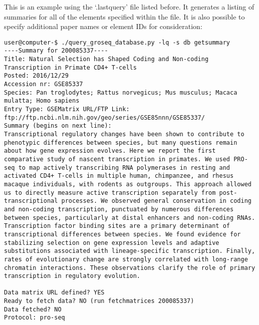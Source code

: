\documentclass[12pt,letterpaper]{article}
\begin{document}
This is an example using the `.lastquery' file listed before. It generates a listing of summaries for all of the elements specified within the file.
It is also possible to specify additional paper names or element IDs for consideration:
\begin{verbatim}
user@computer-$ ./query_groseq_database.py -lq -s db getsummary
----Summary for 200085337----
Title: Natural Selection has Shaped Coding and Non-coding Transcription in Primate CD4+ T-cells
Posted: 2016/12/29
Accession nr: GSE85337
Species: Pan troglodytes; Rattus norvegicus; Mus musculus; Macaca mulatta; Homo sapiens
Entry Type: GSEMatrix URL/FTP Link: ftp://ftp.ncbi.nlm.nih.gov/geo/series/GSE85nnn/GSE85337/
Summary (begins on next line):
Transcriptional regulatory changes have been shown to contribute to phenotypic differences between species, but many questions remain about how gene expression evolves. Here we report the first comparative study of nascent transcription in primates. We used PRO-seq to map actively transcribing RNA polymerases in resting and activated CD4+ T-cells in multiple human, chimpanzee, and rhesus macaque individuals, with rodents as outgroups. This approach allowed us to directly measure active transcription separately from post-transcriptional processes. We observed general conservation in coding and non-coding transcription, punctuated by numerous differences between species, particularly at distal enhancers and non-coding RNAs. Transcription factor binding sites are a primary determinant of transcriptional differences between species. We found evidence for stabilizing selection on gene expression levels and adaptive substitutions associated with lineage-specific transcription. Finally, rates of evolutionary change are strongly correlated with long-range chromatin interactions. These observations clarify the role of primary transcription in regulatory evolution.

Data matrix URL defined? YES
Ready to fetch data? NO (run fetchmatrices 200085337)
Data fetched? NO
Protocol: pro-seq


\end{verbatim}
\end{document}
